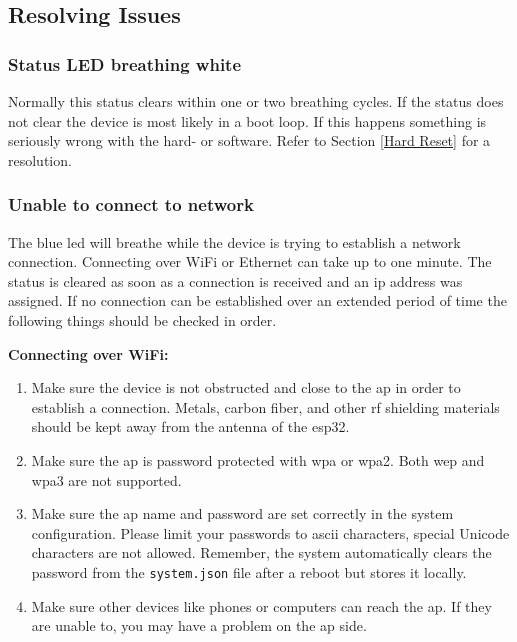 \subsection{Resolving Issues} \label{Resolving Issues}

\subsubsection{Status LED breathing white}
Normally this status clears within one or two breathing cycles. If the status does not clear the device is most likely in a boot loop. If this happens something is seriously wrong with the hard- or software. Refer to Section \ref{Hard Reset} for a resolution.

\subsubsection{Unable to connect to network}
The blue \acrshort{led} will breathe while the device is trying to establish a network connection. Connecting over WiFi or Ethernet can take up to one minute. The status is cleared as soon as a connection is received and an \acrshort{ip} address was assigned. If no connection can be established over an extended period of time the following things should be checked in order.

\textbf{Connecting over WiFi:}
\begin{enumerate}
  \item Make sure the device is not obstructed and close to the \acrlong{ap} in order to establish a connection. Metals, carbon fiber, and other \acrshort{rf} shielding materials should be kept away from the antenna of the \gls{esp32}.
  \item Make sure the \acrlong{ap} is password protected with \acrshort{wpa} or \acrshort{wpa}2. Both \acrshort{wep} and \acrshort{wpa}3 are not supported.
  \item Make sure the \acrlong{ap} name and password are set correctly in the system configuration. Please limit your passwords to \acrshort{ascii} characters, special Unicode characters are not allowed. Remember, the system automatically clears the password from the \texttt{system.json} file after a reboot but stores it locally.
  \item Make sure other devices like phones or computers can reach the \acrlong{ap}. If they are unable to, you may have a problem on the \acrshort{ap} side.
\end{enumerate}

